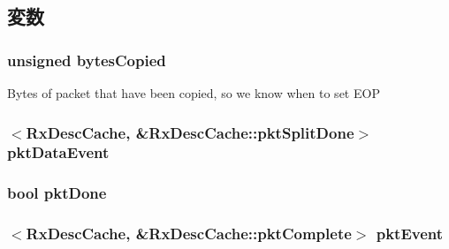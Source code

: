 \subsection{変数}
\hypertarget{classIGbE_1_1RxDescCache_ac3c1fb8dcc0c6c83f6a85ef03c5047db}{
\subsubsection[{bytesCopied}]{\setlength{\rightskip}{0pt plus 5cm}unsigned {\bf bytesCopied}}}
\label{classIGbE_1_1RxDescCache_ac3c1fb8dcc0c6c83f6a85ef03c5047db}
Bytes of packet that have been copied, so we know when to set EOP \hypertarget{classIGbE_1_1RxDescCache_a80533f1573c797ab5f5333d376e899c7}{
\subsubsection[{pktDataEvent}]{$<${\bf RxDescCache}, \&RxDescCache::pktSplitDone$>$ {\bf pktDataEvent}}}
\label{classIGbE_1_1RxDescCache_a80533f1573c797ab5f5333d376e899c7}
\hypertarget{classIGbE_1_1RxDescCache_a0807bda2e863c4492ab0165135bf396c}{
\subsubsection[{pktDone}]{\setlength{\rightskip}{0pt plus 5cm}bool {\bf pktDone}}}
\label{classIGbE_1_1RxDescCache_a0807bda2e863c4492ab0165135bf396c}
\hypertarget{classIGbE_1_1RxDescCache_a28964c300d774b0dc1d7cabcff1cdc7b}{
\subsubsection[{pktEvent}]{$<${\bf RxDescCache}, \&RxDescCache::pktComplete$>$ {\bf pktEvent}}}
